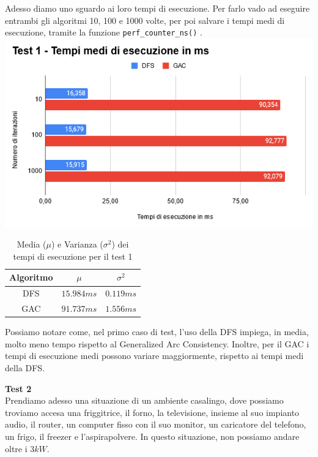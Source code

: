 \documentclass[12pt, letterpaper]{article}
\begin{document}
\noindent Adesso diamo uno sguardo ai loro tempi di esecuzione. Per farlo vado ad eseguire
entrambi gli algoritmi 10, 100 e 1000 volte, per poi salvare i tempi medi di esecuzione, tramite
la funzione \lstinline|perf_counter_ns()| \cite{perf_counter_ns_docs}. \\

\includegraphics[scale=0.8]{test-1-performance.png}

\begin{table}[h!]
      \centering
      \begin{tabular}{| c | c | c |}
            \hline
            Algoritmo & $\mu$      & $\sigma^2$ \\
            \hline
            DFS       & $15.984ms$ & $0.119ms$  \\
            GAC       & $91.737ms$ & $1.556ms$  \\
            \hline
      \end{tabular}
      \caption{Media ($\mu$) e Varianza ($\sigma^2$) dei tempi di esecuzione per il test 1}
\end{table}

\noindent Possiamo notare come, nel primo caso di test, l'uso della DFS impiega, in media, molto meno
tempo rispetto al Generalized Arc Consistency.
Inoltre, per il GAC i tempi di esecuzione medi possono variare maggiormente, rispetto ai
tempi medi della DFS. \\ \break


\noindent \textbf{Test 2} \\

\noindent Prendiamo adesso una situazione di un ambiente casalingo, dove possiamo troviamo accesa una
friggitrice, il forno, la televisione, insieme al suo impianto audio, il router, un computer
fisso con il suo monitor, un caricatore del telefono, un frigo, il freezer e l'aspirapolvere.
In questo situazione, non possiamo andare oltre i $3kW$. \\
\end{document}
